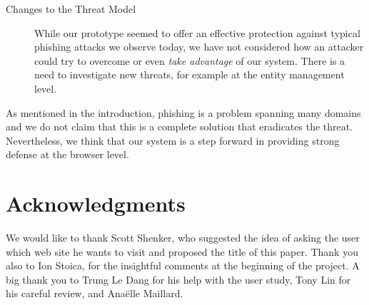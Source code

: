 \documentclass[11pt,styles/chicago,a4paper]{article}
\begin{document}
\begin{description}
\item[Changes to the Threat Model] While our prototype seemed to offer an effective protection against typical phishing attacks we observe today, we have not considered how an attacker could try to overcome or even \emph{take advantage} of our system. There is a need to investigate new threats, for example at the entity management level. 

\end{description}

As mentioned in the introduction, phishing is a problem spanning many domains and we do not claim that this is a complete solution that eradicates the threat. Nevertheless, we think that our system is a step forward in providing strong defense at the browser level.

\section*{Acknowledgments}
We would like to thank Scott Shenker, who suggested the idea of asking the user which web site he wants to visit and proposed the title of this paper. Thank you also to Ion Stoica, for the insightful comments at the beginning of the project. A big thank you to Trung Le Dang for his help with the user study, Tony Lin for his careful review, and Ana\"elle Maillard.


\end{document}
